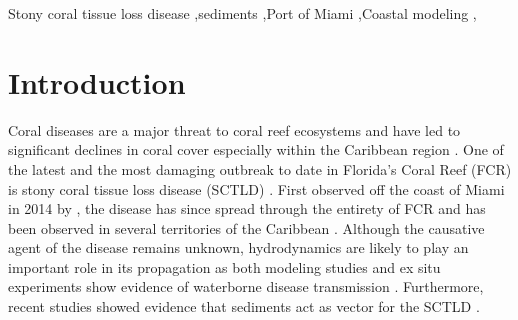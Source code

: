 \documentclass[preprint,12pt,authoryear]{elsarticle}
\begin{document}
\begin{frontmatter}


    \begin{keyword}
        Stony coral tissue loss disease \sep sediments \sep Port of Miami \sep Coastal modeling \sep 



    \end{keyword}

\end{frontmatter}

\linenumbers

\section{Introduction}

Coral diseases are a major threat to coral reef ecosystems and have led to significant declines in coral cover especially within the Caribbean region \citep{richardson1998coral, sutherland2004disease, aronson2001white, harvell2007coral, brandt2009dynamics}. One of the latest and the most damaging outbreak to date in Florida's Coral Reef (FCR) is stony coral tissue loss disease (SCTLD) \citep{noaa2018}. First observed off the coast of Miami in 2014 by \cite{precht2016unprecedented}, the disease has since spread through the entirety of FCR \citep{muller2020spatial,dobbelaere2022} and has been observed in several territories of the Caribbean \citep{kramer2019map, meiling2021variable, estrada2021effects,heres2021ecological}. Although the causative agent of the disease remains unknown, hydrodynamics are likely to play an important role in its propagation as both modeling studies and ex situ experiments show evidence of waterborne disease transmission \citep{aeby2019pathogenesis,dobbelaere2020coupled,eaton2021measuring, meiling2021variable}. Furthermore, recent studies showed evidence that sediments act as vector for the SCTLD \citep{rosales2020rhodobacterales, studivan2022reef}.
\end{document}
